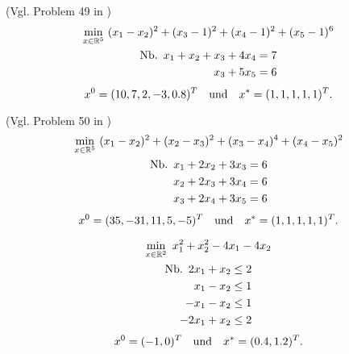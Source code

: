 \begin{testproblem}
(Vgl. Problem 49 in \cite[S.~72]{hock})
\begin{gather}
\min_{x\in\R^5}\ (x_1-x_2)^2 + (x_3-1)^2 + (x_4-1)^2 + (x_5-1)^6  \notag \\
\begin{split}
\nb x_1 + x_2 + x_3 + 4 x_4 & = 7 \\
x_3 + 5 x_5 & = 6 \\
\end{split}
\end{gather}
\begin{equation*}
x^0 = (10, 7, 2, -3, 0.8)^T \quad\text{und}\quad x^* = (1, 1, 1, 1, 1)^T.
\end{equation*}
\end{testproblem}

\begin{testproblem}
(Vgl. Problem 50 in \cite[S.~73]{hock})
\begin{gather}
\min_{x\in\R^5}\ (x_1-x_2)^2 + (x_2-x_3)^2 + (x_3-x_4)^4 + (x_4-x_5)^2  \notag \\
\begin{split}
\nb x_1 + 2 x_2 + 3 x_3 & = 6 \\
x_2 + 2 x_3 + 3 x_4 & = 6 \\
x_3 + 2 x_4 + 3 x_5 & = 6 \\
\end{split}
\end{gather}
\begin{equation*}
x^0 = (35, -31, 11, 5, -5)^T \quad\text{und}\quad x^* = (1, 1, 1, 1, 1)^T.
\end{equation*}
\end{testproblem}

\begin{testproblem}
\begin{gather}
\min_{x\in\R^2}\ x_1^2 + x_2^2 - 4 x_1 - 4 x_2 \notag \\
\begin{split}
\nb 2 x_1 + x_2 & \leq 2 \\
x_1 - x_2 & \leq 1 \\
-x_1 - x_2 & \leq 1 \\
-2 x_1 + x_2 & \leq 2 \\
\end{split}
\end{gather}
\begin{equation*}
x^0 = (-1, 0)^T \quad\text{und}\quad x^* = (0.4, 1.2)^T.
\end{equation*}
\end{testproblem}

